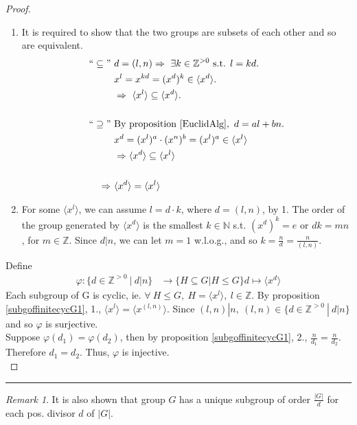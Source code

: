 \documentclass{article}
\theoremstyle{definition}
\theoremstyle{remark}
\newtheorem*{remark}{Remark}
\begin{document}
\begin{proof}~
\begin{enumerate}
\item It is required to show that the two groups are subsets of each other and so are equivalent.
		  \begin{align*}
			``\subseteq" ~& d=(l,n)\Rightarrow~\exists k\in\mathbb{Z}^{>0}\text{ s.t. } l=kd.\\
							      & x^l=x^{kd}=(x^d)^k\in\langle x^d\rangle.\\
							      &\Rightarrow~\langle x^l\rangle\subseteq \langle x^d\rangle.\\
							    ~&~\\
			``\supseteq" ~& \text{By proposition }	\ref{EuclidAlg},~d=al+bn.\\
							      & x^d=(x^l)^a\cdot(x^n)^b=(x^l)^a\in\langle x^l\rangle\\
							      & \Rightarrow \langle x^d\rangle \subseteq \langle x^l\rangle\\
							    ~&~\\
		     \Rightarrow~& \langle x^d\rangle = \langle x^l\rangle
		  \end{align*}
\item For some $\langle x^l\rangle$, we can assume $l=d\cdot k$, where $d=(l,n)$, by 1. The order of the group generated by $\langle x^d\rangle$ is the smallest $k\in \mathbb{N}$ s.t. $(x^d)^k=e$ or $dk=mn$, for $m\in\mathbb{Z}$. Since $d|n$, we can let $m=1$ w.l.o.g., and so $k=\frac{n}{d}=\frac{n}{(l,n)}$.
\end{enumerate}
Define 
\begin{align*}
\varphi: \lbrace d\in\mathbb{Z}^{>0}~|~d|n\rbrace &\rightarrow \lbrace H \subseteq G | H\leq G\rbrace
d\mapsto\langle x^d\rangle
\end{align*}
Each subgroup of G is cyclic, ie. $\forall~H\leq G,~H=\langle x^l\rangle,~l\in\mathbb{Z}$. By proposition \ref{subgoffinitecycG1}, 1., $\langle x^l\rangle=\langle x^{(l,n)}\rangle$. Since $(l,n)|n,~(l,n)\in \lbrace d\in\mathbb{Z}^{>0}~|~d|n\rbrace$ and so $\varphi$ is surjective.\\
\indent Suppose $\varphi(d_1)=\varphi(d_2)$, then by proposition \ref{subgoffinitecycG1}, 2., $\frac{n}{d_1}=\frac{n}{d_2}$. Therefore $d_1=d_2$. Thus, $\varphi$ is injective.\\
\end{proof}
\hrule
\vspace{2mm}
\begin{remark}
It is also shown that group $G$ has a unique subgroup of order $\frac{|G|}{d}$ for each pos. divisor $d$ of $|G|$.\\
\end{remark}
\end{document}
